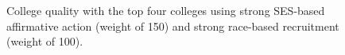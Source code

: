 \begin{figure}[p]
  \centering
  \hfill%
  \caption{College quality with the top four colleges using strong SES-based affirmative action (weight of 150) and strong race-based recruitment (weight of 100).}
  \label{fig:c5}
\end{figure}

